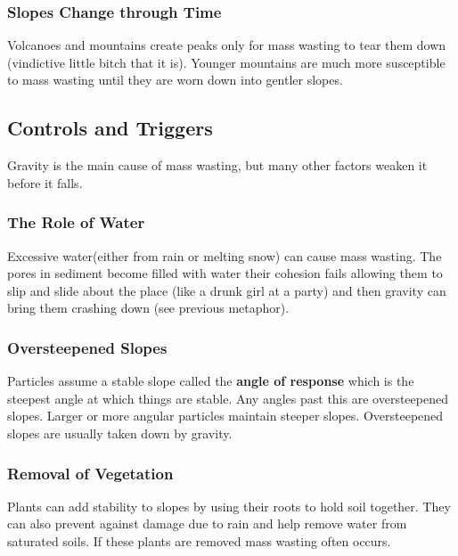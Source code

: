 \documentclass{article}
\begin{document}
\subsubsection{Slopes Change through Time} %
\label{ssub:slopes_change_through_time}
Volcanoes and mountains create peaks only for mass wasting to tear them down (vindictive little bitch that it is). Younger mountains are much more susceptible to mass wasting until they are worn down into gentler slopes.

\subsection{Controls and Triggers} %
\label{sub:controls_and_triggers}
Gravity is the main cause of mass wasting, but many other factors weaken it before it falls.

\subsubsection{The Role of Water} %
\label{ssub:the_role_of_water}
Excessive water(either from rain or melting snow) can cause mass wasting. The pores in sediment become filled with water their cohesion fails allowing them to slip and slide about the place (like a drunk girl at a party) and then gravity can bring them crashing down (see previous metaphor).
\subsubsection{Oversteepened Slopes} %
\label{ssub:oversteepened_slopes}
Particles assume a stable slope called the \textbf{angle of response} which is the steepest angle at which things are stable. Any angles past this are oversteepened slopes. Larger or more angular particles maintain steeper slopes. Oversteepened slopes are usually taken down by gravity.

\subsubsection{Removal of Vegetation} %
\label{ssub:removal_of_vegetation}
Plants can add stability to slopes by using their roots to hold soil together. They can also prevent against damage due to rain and help remove water from saturated soils. If these plants are removed mass wasting often occurs.
\end{document}
